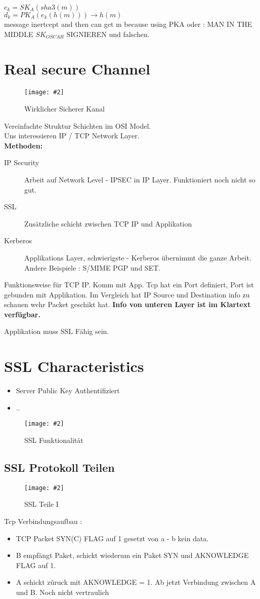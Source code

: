 \documentclass[a4paper,10pt]{scrreprt}
\newcommand{\pic}[2][figure]{\begin{figure}[h]
 \centering
 \texttt{[image: \#2]}
 \caption{#1}
\end{figure}
}
\begin{document}
$ e_k=SK_A (sha3(m))$ \\
$ d_k=PK_A (e_k(h(m))) \rightarrow h(m)$ \\ message inertcept and then can get m because using PKA
oder :
MAN IN THE MIDDLE $SK_{OSCAR}$ SIGNIEREN und falschen. \\

\section{Real secure Channel}
\pic[Wirklicher Sicherer Kanal]{rsc.png}

Vereinfachte Struktur Schichten im OSI Model.\\
Uns interessieren IP / TCP Network Layer.\\
\textbf{Methoden:}
\begin{description}
 \item [IP Security] Arbeit auf Network Level - IPSEC in IP Layer. Funktioniert noch nicht so gut.
 \item [SSL] Zusätzliche schicht zwischen TCP IP und Applikation
 \item [Kerberos] Applikations Layer, schwierigste - Kerberos übernimmt die ganze Arbeit. Andere Beispiele :
 S/MIME PGP und SET.
\end{description}

Funktionsweise für TCP IP. Komm mit App. Tcp hat ein Port definiert, Port ist gebunden mit Applikation. Im Vergleich hat 
IP Source und Destination info zu schauen wehr Packet geschikt hat. \textbf{Info von unteren Layer ist im Klartext 
verfügbar.}

Applikation muss SSL Fähig sein.

\section{SSL Characteristics}
\begin{itemize}
 \item Server Public Key Authentifiziert
 \item ..
\end{itemize}

\pic[SSL Funktionalität]{sslfunc.png}

\subsection{SSL Protokoll Teilen}
\pic[SSL Teile I]{ssl_parts1.png}

Tcp Verbindungsaufbau : 
\begin{itemize}
 \item TCP Packet SYN(C) FLAG auf 1 gesetzt von a - b kein data.
 \item B empfängt Paket, schickt wiederum ein Paket SYN und AKNOWLEDGE FLAG auf 1.
 \item A schickt züruck mit AKNOWLEDGE = 1. Ab jetzt Verbindung zwischen A und B. Noch nicht vertraulich
\end{itemize}
\end{document}
